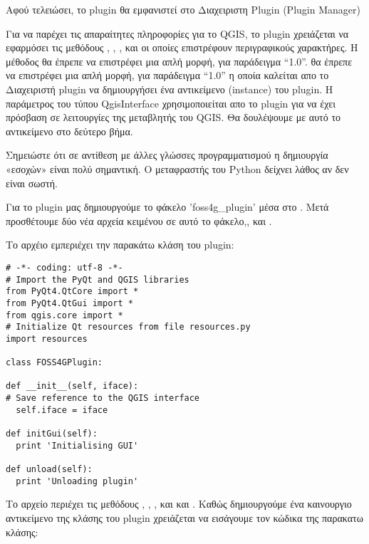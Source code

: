 Αφού τελειώσει, το plugin θα εμφανιστεί στο Διαχειριστη Plugin (Plugin Manager)

Για να παρέχει τις απαραίτητες πληροφορίες για το QGIS, το plugin χρειάζεται να εφαρμόσει τις μεθόδους  , , ,
 και  οι οποίες επιστρέφουν περιγραφικούς χαρακτήρες.
Η μέθοδος  θα έπρεπε να επιστρέφει μια απλή μορφή, για παράδειγμα “1.0”. θα έπρεπε να επιστρέφει μια απλή μορφή, για παράδειγμα “1.0”  η οποία καλείται απο το Διαχειριστή plugin να δημιουργήσει ένα αντικείμενο (instance) του plugin. H παράμετρος του τύπου QgisInterface χρησιμοποιείται απο το plugin για να έχει πρόσβαση σε λειτουργίες της μεταβλητής του QGIS. Θα δουλέψουμε με αυτό το αντικείμενο στο δεύτερο βήμα. 

Σημειώστε ότι σε αντίθεση με άλλες γλώσσες προγραμματισμού η δημιουργία «εσοχών» είναι πολύ σημαντική. Ο μεταφραστής του Python δείχνει λάθος αν δεν είναι σωστή. 

Για το plugin μας δημιουργούμε το φάκελο 'foss4g\_plugin' μέσα στο 
. Μετά προσθέτουμε δύο νέα αρχεία κειμένου σε αυτό το φάκελο,,  και .

Το αρχέιο  εμπεριέχει την παρακάτω κλάση του plugin: 

\begin{verbatim}
# -*- coding: utf-8 -*-
# Import the PyQt and QGIS libraries
from PyQt4.QtCore import *
from PyQt4.QtGui import *
from qgis.core import *
# Initialize Qt resources from file resources.py
import resources

class FOSS4GPlugin:

def __init__(self, iface):
# Save reference to the QGIS interface
  self.iface = iface

def initGui(self):
  print 'Initialising GUI'

def unload(self):
  print 'Unloading plugin'
\end{verbatim}

Το αρχείο  περιέχει τις μεθόδους ,
, , 
και  και . Καθώς δημιουργούμε ένα καινουργιο αντικείμενο της κλάσης του plugin χρειάζεται να εισάγουμε τον κώδικα της παρακατω κλάσης:

